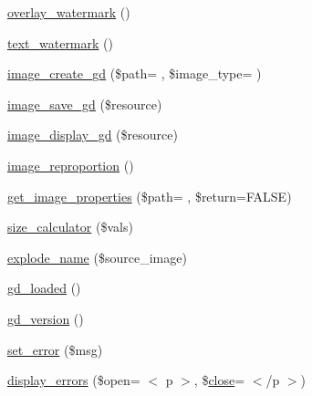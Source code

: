 \begin{DoxyCompactItemize}
\item 
\hyperlink{class_c_i___image__lib_a7fa0fd0aabe26803d61d7e09c1cb73de}{overlay\+\_\+watermark} ()
\item 
\hyperlink{class_c_i___image__lib_afb7640b6150e16b00efac0511d9fa03d}{text\+\_\+watermark} ()
\item 
\hyperlink{class_c_i___image__lib_a9de08e24f6573c9d80ccf38f95c33d1f}{image\+\_\+create\+\_\+gd} (\$path= \textquotesingle{}\textquotesingle{}, \$image\+\_\+type= \textquotesingle{}\textquotesingle{})
\item 
\hyperlink{class_c_i___image__lib_a802a33d51249d4d31d59cbc89fbc4dd5}{image\+\_\+save\+\_\+gd} (\$resource)
\item 
\hyperlink{class_c_i___image__lib_af641d1806701b178dfba3dbf7da54462}{image\+\_\+display\+\_\+gd} (\$resource)
\item 
\hyperlink{class_c_i___image__lib_a55ee590fb313c50e99d6c1d4cd9618d2}{image\+\_\+reproportion} ()
\item 
\hyperlink{class_c_i___image__lib_a77ab93f41bdc26b9220b69a91644d854}{get\+\_\+image\+\_\+properties} (\$path= \textquotesingle{}\textquotesingle{}, \$return=F\+A\+L\+S\+E)
\item 
\hyperlink{class_c_i___image__lib_a827549db4de2281a8f2b35ada2ef3909}{size\+\_\+calculator} (\$vals)
\item 
\hyperlink{class_c_i___image__lib_a32661288e0bea18ea50fbb7be6535af5}{explode\+\_\+name} (\$source\+\_\+image)
\item 
\hyperlink{class_c_i___image__lib_a04376d5530f38a1a61f59c2d769284ba}{gd\+\_\+loaded} ()
\item 
\hyperlink{class_c_i___image__lib_a7d141f85d677d5e6db12020009569fde}{gd\+\_\+version} ()
\item 
\hyperlink{class_c_i___image__lib_a892f1ba7cba3731a3fc68f1f64e92610}{set\+\_\+error} (\$msg)
\item 
\hyperlink{class_c_i___image__lib_a3ed4aa1a4d480c82bb1b663efd466aee}{display\+\_\+errors} (\$open= \textquotesingle{}$<$ p $>$\textquotesingle{}, \$\hyperlink{assets_2js_2bootstrap_8min_8js_afaca3a961d693f40135a872e93e71198}{close}= \textquotesingle{}$<$/p $>$\textquotesingle{})
\end{DoxyCompactItemize}
